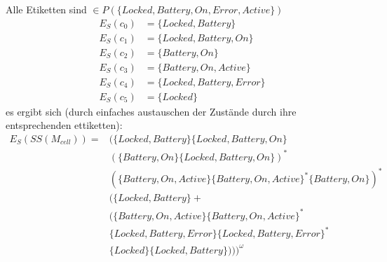 Alle Etiketten sind $\in P(\{Locked,Battery,On,Error,Active\})$
\begin{align*}
E_S(c_0)&=\{Locked,Battery\}\\
E_S(c_1)&=\{Locked,Battery,On\}\\
E_S(c_2)&=\{Battery,On\}\\
E_S(c_3)&=\{Battery,On,Active\}\\
E_S(c_4)&=\{Locked,Battery,Error\}\\
E_S(c_5)&=\{Locked\}
\end{align*}
es ergibt sich (durch einfaches austauschen der Zustände durch ihre entsprechenden ettiketten):
\begin{align*}
 E_S(SS(M_{cell}))=&( \{Locked,Battery\}\{Locked,Battery,On\}\\
 &(\{Battery,On\}\{Locked,Battery,On\})^*\\
 &(\{Battery,On,Active\}\{Battery,On,Active\}^*\{Battery,On\})^*\\
 &(\{Locked,Battery\} + \\
 &(\{Battery,On,Active\}\{Battery,On,Active\}^*\\
 &\{Locked,Battery,Error\}\{Locked,Battery,Error\}^*\\
 &\{Locked\}\{Locked,Battery\})))^\omega
 \end{align*}